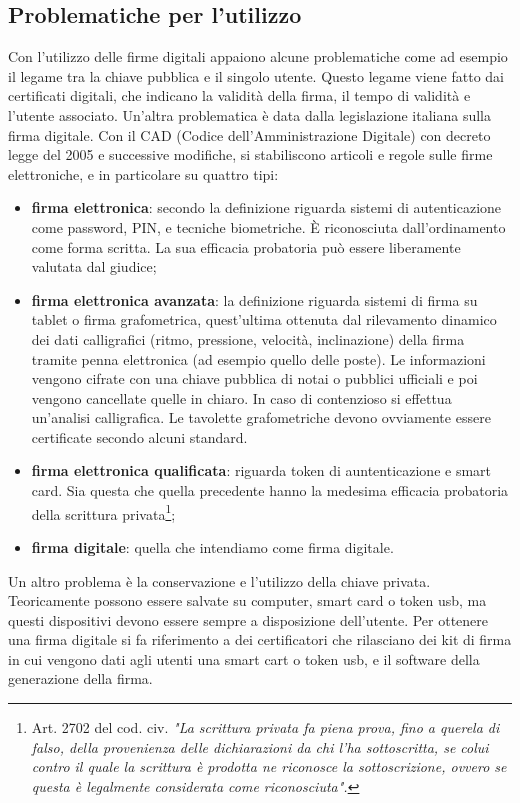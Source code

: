\subsection{Problematiche per l'utilizzo}
Con l'utilizzo delle firme digitali appaiono alcune problematiche come ad esempio il legame tra la chiave pubblica e il singolo utente. Questo legame viene fatto dai certificati digitali, che indicano la validità della firma, il tempo di validità e l'utente associato. Un'altra problematica è data dalla legislazione italiana sulla firma digitale. Con il CAD (Codice dell'Amministrazione Digitale) con decreto legge del 2005 e successive modifiche, si stabiliscono articoli e regole sulle firme elettroniche, e in particolare su quattro tipi:
\begin{itemize}
    \item \textbf{firma elettronica}: secondo la definizione riguarda sistemi di autenticazione come password, PIN, e tecniche biometriche. È riconosciuta dall'ordinamento come forma scritta. La sua efficacia probatoria può essere liberamente valutata dal giudice;
    \item \textbf{firma elettronica avanzata}: la definizione riguarda sistemi di firma su tablet o firma grafometrica, quest'ultima ottenuta dal rilevamento dinamico dei dati calligrafici (ritmo, pressione, velocità, inclinazione) della firma tramite penna elettronica (ad esempio quello delle poste). Le informazioni vengono cifrate con una chiave pubblica di notai o pubblici ufficiali e poi vengono cancellate quelle in chiaro. In caso di contenzioso si effettua un'analisi calligrafica. Le tavolette grafometriche devono ovviamente essere certificate secondo alcuni standard.
    \item \textbf{firma elettronica qualificata}: riguarda token di auntenticazione e smart card. Sia questa che quella precedente hanno la medesima efficacia probatoria della scrittura privata\footnote{Art. 2702 del cod. civ. \textit{"La scrittura privata fa piena prova, fino a querela di falso, della provenienza delle dichiarazioni da chi l'ha sottoscritta, se colui contro il quale la scrittura è prodotta ne riconosce la sottoscrizione, ovvero se questa è legalmente considerata come riconosciuta".}};
    \item \textbf{firma digitale}: quella che intendiamo come firma digitale. 
\end{itemize}
Un altro problema è la conservazione e l'utilizzo della chiave privata. Teoricamente possono essere salvate su computer, smart card o token usb, ma questi dispositivi devono essere sempre a disposizione dell'utente. Per ottenere una firma digitale si fa riferimento a dei certificatori che rilasciano dei kit di firma in cui vengono dati agli utenti una smart cart o token usb, e il software della generazione della firma. 

